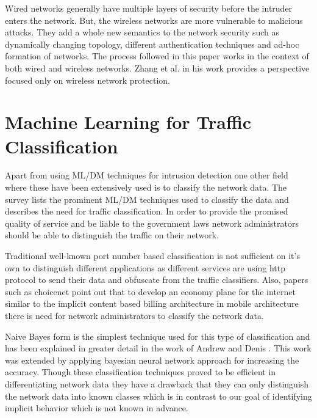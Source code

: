 Wired networks generally have multiple layers of security before the intruder enters the network. But, the wireless networks are more vulnerable to malicious attacks. They add a whole new semantics to the network security such as dynamically changing topology, different authentication techniques and ad-hoc formation of networks. The process  followed in this paper works in the context of both wired and wireless networks. Zhang et al. in his work \cite{zhang2003intrusion} provides a perspective focused only on wireless network protection.

\section{Machine Learning for Traffic Classification}

Apart from using ML/DM techniques for intrusion detection one other field where these have been extensively used is to classify the network data. The survey \cite{nguyen2008survey} lists the prominent ML/DM techniques used to classify the data and describes the need for traffic classification. In order to provide the promised quality of service and be liable to the government laws network administrators should be able to distinguish the traffic on their network. 

Traditional well-known port number based classification is not sufficient on it's own to distinguish different applications  as different services are using http protocol to send their data and obfuscate from the traffic classifiers. Also, papers such as choicenet \cite{wolf2014choicenet} point out that to develop an economy plane for the internet similar to the implicit content based billing architecture in mobile architecture there is need for network administrators to classify the network data.

Naive Bayes form is the simplest technique used for this type of classification and has been explained in greater detail in the work of Andrew and Denis \cite{moore2005internet}. This work was extended by applying bayesian neural network approach \cite{auld2007bayesian} for increasing the accuracy. Though these classification techniques proved to be efficient in differentiating network data they have a drawback that they can only distinguish the network data into known classes which is in contrast to our goal of identifying implicit behavior which is not known in advance.

